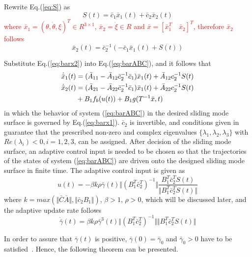 \documentclass[3p]{elsarticle}
\theoremstyle{plain}
\begin{document}
Rewrite Eq.(\ref{eq:S}) as
\begin{equation}
S(t) = \bar{c}_1\bar{x}_1(t)+\bar{c}_2\bar{x}_2(t)
\end{equation}
\textcolor{red}{where $\bar{x}_1 =(\theta,\dot \theta,\xi)^T\in R^{3\times 1}$, $\bar{x}_2 = \dot \xi\in R$ and $\bar{x} = [\bar{x}_1^T \quad \bar{x}_2]^T$, therefore $\bar{x}_2$ follows}
\begin{equation}
\bar{x}_2(t) = \bar{c}_2^{-1}(-\bar{c}_1\bar{x}_1(t)+S(t))\label{eq:barx2}
\end{equation}\par
Substitute Eq.(\ref{eq:barx2}) into Eq.(\ref{eq:barABC}), and it follows that
\begin{align}
\dot{\bar{x}}_1(t) &= (\bar{A}_{11}-\bar{A}_{12}\bar{c}_2^{-1}\bar{c}_1)\bar{x}_1(t)+\bar{A}_{12}c_2^{-1}S(t)\label{eq:barx1}\\
\dot{\bar{x}}_2(t) &= (\bar{A}_{21}-\bar{A}_{22}\bar{c}_2^{-1}\bar{c}_1)\bar{x}_1(t)+\bar{A}_{22}c_2^{-1}S(t)\notag\\&+B_1f_b(u(t))+B_1g(T^{-1}\bar{x},t)
\end{align}
in which the behavior of system (\ref{eq:barABC}) in the desired sliding mode surface is governed by Eq.(\ref{eq:barx1}). $\bar{c}_2$ is invertible, and conditions given in~\cite{lyshevski2012control} guarantee that the prescribed non-zero and complex eigenvalues $\{\lambda_1,\lambda_2,\lambda_{3}\}$ with $Re(\lambda_i)<0,i=1,2,3$, can be assigned.
After decision of the sliding mode surface, an adaptive control input is needed to be chosen so that the trajectories of the states of system (\ref{eq:barABC}) are driven onto the designed sliding mode surface in finite time. The adaptive control input is given as
\begin{equation}
u(t) = -\beta k \rho \bar{\gamma}(t)\Vert(B_1^T\bar{c}_2^T)^{-1}\Vert\frac{B_1^T\bar{c}_2^TS(t)}{\Vert B_1^T\bar{c}_2^TS(t)\Vert}\label{eq:ut}
\end{equation}
where $k = max(\Vert\bar{C}\bar{A}\Vert,\Vert\bar{c}_2B_1\Vert)$, $\beta >1$, $\rho > 0$, which will be discussed later, and the adaptive update rate follows
\begin{equation}
\dot{\bar{\gamma}}(t) = \beta k \rho \bar{\gamma}^3(t)\Vert(B_1^T\bar{c}_2^T)^{-1}\Vert\Vert B_1^T\bar{c}_2^TS(t)\Vert
\end{equation}\par
In order to assure that $\bar{\gamma}(t)$ is positive, $\bar{\gamma}(0)=\bar{\gamma}_0$ and $\bar{\gamma}_0 > 0$ have to be satisfied~\cite{Hu2008Robust}. Hence, the following theorem can be presented.
\end{document}
